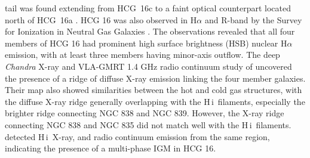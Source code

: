 \documentclass{aa}
\newcommand{\HI}{H\,{\sc i}}
\begin{document}
tail was found extending from HCG~16c to a faint optical counterpart located north of HCG~16a \citep{2019A&A...632A..78J, 2021A&A...649L..14R}.    
HCG 16 was also observed in H$\alpha$ and R-band by the Survey for Ionization 
in Neutral Gas Galaxies \citep[SINGG,][]{2006ApJS..165..307M}. The observations revealed that all four members of HCG 16 had prominent high surface brightness 
(HSB) nuclear H$\alpha$ emission, with at least three members having  minor-axis outflow. The deep \textit{Chandra} X-ray and VLA-GMRT 1.4 GHz radio continuum 
study of \citet{2014ApJ...793...73O} uncovered the presence of a ridge of diffuse X-ray emission linking the four member galaxies. Their map also showed 
similarities between the hot and cold gas structures, with the diffuse X-ray ridge generally overlapping with the \HI\ filaments, especially the brighter 
ridge connecting NGC 838 and NGC 839. However, the X-ray ridge connecting NGC 838 and NGC 835 did not match well with the \HI\ filaments. \citet{2014ApJ...793...73O} 
detected \HI\, X-ray, and radio continuum emission from the same region, indicating the presence of a multi-phase IGM in HCG 16. 
\end{document}
